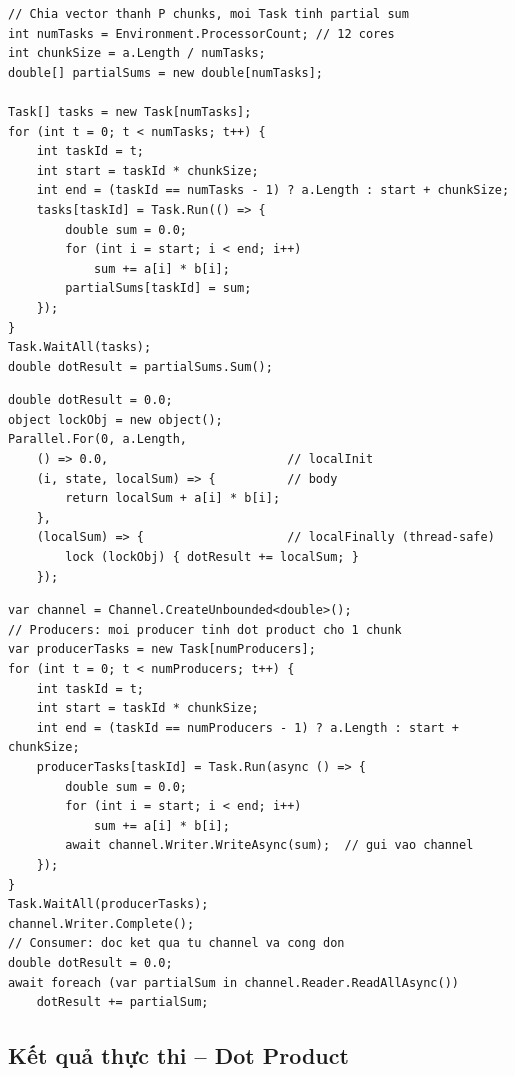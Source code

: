 \documentclass[12pt,a4paper]{article}
\begin{document}
\begin{lstlisting}[style=csharpstyle, caption={C\# Thread/Task -- Dot Product}, label={lst:dot_task}]
// Chia vector thanh P chunks, moi Task tinh partial sum
int numTasks = Environment.ProcessorCount; // 12 cores
int chunkSize = a.Length / numTasks;
double[] partialSums = new double[numTasks];

Task[] tasks = new Task[numTasks];
for (int t = 0; t < numTasks; t++) {
    int taskId = t;
    int start = taskId * chunkSize;
    int end = (taskId == numTasks - 1) ? a.Length : start + chunkSize;
    tasks[taskId] = Task.Run(() => {
        double sum = 0.0;
        for (int i = start; i < end; i++)
            sum += a[i] * b[i];
        partialSums[taskId] = sum;
    });
}
Task.WaitAll(tasks);
double dotResult = partialSums.Sum();
\end{lstlisting}

\begin{lstlisting}[style=csharpstyle, caption={C\# Parallel.For -- Dot Product với localInit/localFinally}, label={lst:dot_parallel}]
double dotResult = 0.0;
object lockObj = new object();
Parallel.For(0, a.Length,
    () => 0.0,                         // localInit
    (i, state, localSum) => {          // body
        return localSum + a[i] * b[i];
    },
    (localSum) => {                    // localFinally (thread-safe)
        lock (lockObj) { dotResult += localSum; }
    });
\end{lstlisting}

\begin{lstlisting}[style=csharpstyle, caption={C\# Channel -- Dot Product (Producer/Consumer)}, label={lst:dot_channel}]
var channel = Channel.CreateUnbounded<double>();
// Producers: moi producer tinh dot product cho 1 chunk
var producerTasks = new Task[numProducers];
for (int t = 0; t < numProducers; t++) {
    int taskId = t;
    int start = taskId * chunkSize;
    int end = (taskId == numProducers - 1) ? a.Length : start + chunkSize;
    producerTasks[taskId] = Task.Run(async () => {
        double sum = 0.0;
        for (int i = start; i < end; i++)
            sum += a[i] * b[i];
        await channel.Writer.WriteAsync(sum);  // gui vao channel
    });
}
Task.WaitAll(producerTasks);
channel.Writer.Complete();
// Consumer: doc ket qua tu channel va cong don
double dotResult = 0.0;
await foreach (var partialSum in channel.Reader.ReadAllAsync())
    dotResult += partialSum;
\end{lstlisting}

\subsection{Kết quả thực thi -- Dot Product}
\end{document}
